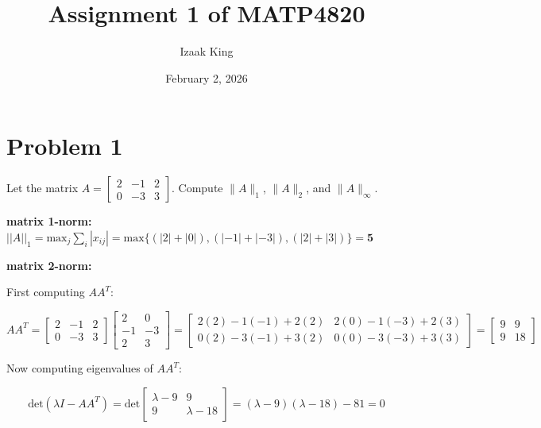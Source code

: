 \documentclass[12pt]{article}
\title{Assignment 1 of \textbf{MATP4820}}
\author{Izaak King}
\date{February 2, 2026}
\begin{document}
\maketitle

\section*{Problem 1}
Let the matrix $A=\left[\begin{array}{rrr} 2 & -1 & 2 \\ 0 & -3 & 3 \end{array}\right]$. Compute $\|A\|_1$, $\|A\|_2$, and $\|A\|_\infty$.

\vspace{9mm}

\textbf{matrix 1-norm:} $||A||_{1} = \text{max}_{j}\sum_{i}|x_{ij}| = \text{max}\{(|2| + |0|), (|-1| + |-3|), (|2| + |3|)\} = \bm{5}$

\vspace{9mm}

\textbf{matrix 2-norm:}

\vspace{3mm}

First computing $AA^{T}$: 

\[AA^{T} =\left[\begin{array}{rrr} 2 & -1 & 2 \\ 0 & -3 & 3 \end{array}\right] \left[\begin{array}{rrr} 2 & 0\\ -1 & -3 \\ 2 & 3 \end{array}\right] = \left[\begin{array}{rrr} 2(2) - 1(-1) + 2(2) & 2(0) - 1(-3) + 2(3) \\ 0(2) - 3(-1) + 3(2) & 0(0) - 3(-3) + 3(3) \end{array}\right] = \left[\begin{array}{rrr} 9 & 9 \\ 9 & 18 \end{array}\right]\]

\vspace{3mm}

Now computing eigenvalues of $AA^{T}$:

\vspace{3mm}

\[ \text{det}(\lambda I - AA^{T}) = \text{det}\left[\begin{array}{ccc} \lambda - 9 & 9 \\ 9 & \lambda - 18 \end{array}\right] = (\lambda - 9)(\lambda - 18) - 81  = 0 \]
\end{document}
